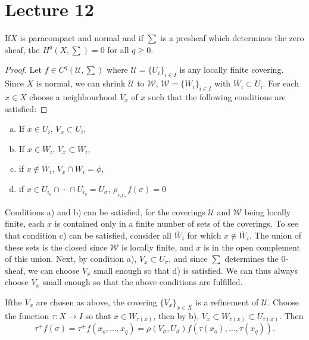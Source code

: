 \chapter{Lecture 12}

\begin{proposition}%
 If\pageoriginale $X$ is paracompact and normal and
    if $\sum$ is a presheaf which determines the zero sheaf, the
   $H^q(X, \sum)=0$ for all $q \geq 0$. 
\end{proposition}

\begin{proof}
Let $f \in C^q (\mathscr{U},\sum)$ where $\mathscr{U} =\{ U_i \}_{i
  \in I}$ is any locally finite covering. Since $X$ is normal, we can
shrink $\mathscr{U}$ to $\mathscr{W}$, $\mathscr{W}=\{ W_i \} _{i \in I}$
with $\bar {W}_i \subset U_i$. For each $x \in X$ choose a
neighbourhood $V_x$  of $x$ such that the following conditions are
satisfied: 
\end{proof}
\begin{enumerate}[a)]
\item If $x \in U_i$, $V_x \subset U_i$,

\item If $x \in W_i$, $V_x \subset W_i$,

\item if $x \notin \bar{W}_i$, $V_x \cap W_i= \phi$,

\item if $x \in U_{i_o} \cap \cdots \cap U_{i_q}=U_\sigma$, $\rho_{_{V_x
  U_\sigma}} f(\sigma)=0$ 
\end{enumerate}

Conditions a) and b) can be satisfied, for the coverings
$\mathscr{U}$ and $\mathscr{W}$ being locally finite, each $x$ is
contained only in a finite number of sets of the coverings. To see
that condition c) can be satisfied, consider all $\bar{W}_i$ for
which $x \notin \bar{W}_i$. The union of these sets is the closed
since $\mathscr{W}$ is locally finite, and $x$ is in the open
complement of this union. Next, by condition a), $V_x \subset
U_\sigma$, and since $\sum$ determines the 0-sheaf, we can choose
$V_x$ small enough so that d) is satisfied. We can thus always
choose $V_x$ small enough so that the above conditions are fulfilled. 

If\pageoriginale the $V_x$ are chosen as above, the covering $\big\{
V_x \big\}_{x   \in X}$ is a refinement of $\mathscr{U}$. Choose the
function $\tau :X \to I$ so that $x \in W_{\tau (x)}$, then by b),
$V_x \subset W_{\tau (x)}\subset U_{\tau (x)}$. Then   
$$
\tau^+ f(\sigma)=\tau^+ f(x_o,\ldots ,x_q)= \rho(V_\sigma, U_ \sigma)f
(\tau (x_o), \ldots , \tau (x_q)). 
$$

